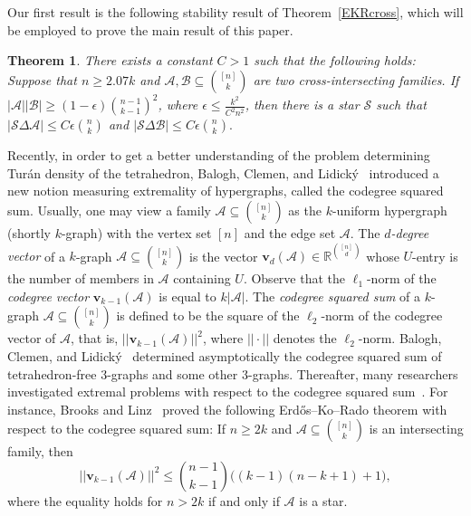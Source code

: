 \documentclass[11pt]{article}
\numberwithin{equation}{section}
\newtheorem{theorem}{Theorem}[section]
\def\RR{\mathbb{R}}
\def\A{\mathcal{A}}
\def\B{\mathcal{B}}
\begin{document}
Our first result is the following stability result of Theorem~\ref{EKRcross}, which will be employed to prove the main result of this paper.


\begin{theorem}\label{EKRcrossstabilitythm}
There exists a constant $C>1$ such that the following holds:
Suppose that $n\geq 2.07k$ and $\A,\B\subseteq \binom{[n]}{k}$ are two cross-intersecting families.
If $|\A||\B|\geq (1-\epsilon)\binom{n-1}{k-1}^2$,
where $\epsilon\leq \frac{k^2}{C^2 n ^2 }$,
then there is a star $\mathcal{S}$ such that
$|\mathcal{S} \Delta \A|\leq C \epsilon \binom{n}{k}$ and
$|\mathcal{S} \Delta \B|\leq C \epsilon \binom{n}{k}.$
\end{theorem}











Recently,
in order to get a better understanding of the problem determining Tur\'an density of the tetrahedron,
Balogh, Clemen, and Lidick\'y~\cite{Baloghsy,Balogh} introduced a new notion measuring extremality of hypergraphs, called the codegree squared sum.
Usually, one may view a family $\A \subseteq \binom{[n]}{k}$ as the $k$-uniform hypergraph (shortly $k$-graph) with the vertex set $[n]$ and the edge set $\A$.
The {\em $d$-degree vector} of a $k$-graph $\A\subseteq \binom{[n]}{k}$ is the vector
$\mathbf{v}_d(\A) \in \RR^{\binom{[n]}{d}}$
whose $U$-entry is the number of members in $\A$ containing $U$.
Observe that the  $\ell_1$-norm of the {\em codegree vector} $\mathbf{v}_{k-1}(\A)$ is equal to $k|\A|$.
The {\em codegree squared sum} of a $k$-graph $\A\subseteq \binom{[n]}{k}$ is defined to be the square of the $\ell_2$-norm of the codegree vector of $\A$, that is, $||\mathbf{v}_{k-1}(\A)||^2$,
where $||\cdot||$ denotes the $\ell_2$-norm.
Balogh, Clemen, and Lidick\'y~\cite{Baloghsy,Balogh}
determined asymptotically the codegree squared sum of tetrahedron-free $3$-graphs and some other $3$-graphs.
Thereafter, many researchers investigated extremal problems with respect to the codegree squared sum~\cite{Brooks,Wu,Cao}.
For instance, Brooks and Linz~\cite[Theorem 1.3]{Brooks} proved the following Erd\H{o}s--Ko--Rado theorem with respect to the codegree squared sum: If $n\geq 2k$ and $\A\subseteq \binom{[n]}{k}$ is an intersecting family,
then
$$||\mathbf{v}_{k-1}(\A)||^2
\leq   \binom{n-1}{k-1}\big((k-1)(n-k+ 1)+1\big),$$
where the equality holds for $n>2k$ if and only if $\A$ is a star.
\end{document}
